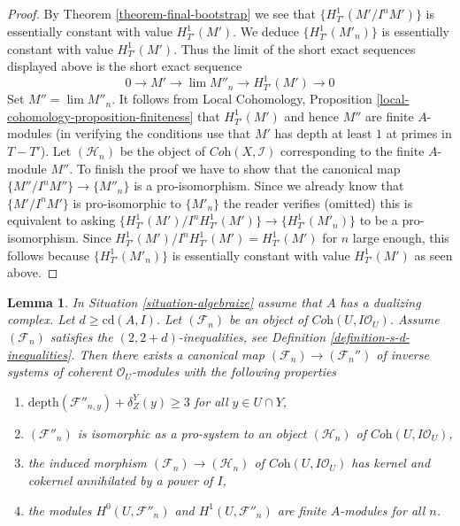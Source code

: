 \documentclass{stacks-project}
\theoremstyle{plain}
\newtheorem{lemma}[subsection]{Lemma}
\theoremstyle{definition}
\theoremstyle{remark}
\numberwithin{equation}{subsection}
\def\lim{\mathop{\mathrm{lim}}\nolimits}
\begin{document}
\begin{proof}
\medskip\noindent
By Theorem \ref{theorem-final-bootstrap} we see that $\{H^1_{T'}(M'/I^nM')\}$
is essentially constant with value $H^1_{T'}(M')$. We deduce
$\{H^1_{T'}(M'_n)\}$ is essentially constant with value $H^1_{T'}(M')$.
Thus the limit of the short exact sequences displayed above
is the short exact sequence
$$
0 \to M' \to \lim M''_n \to H^1_{T'}(M') \to 0
$$
Set $M'' = \lim M''_n$. It follows from
Local Cohomology, Proposition \ref{local-cohomology-proposition-finiteness}
that $H^1_{T'}(M')$ and hence $M''$ are finite $A$-modules (in verifying the
conditions use that $M'$ has depth at least $1$ at primes in $T - T'$).
Let $(\mathcal{H}_n)$ be the object of $\textit{Coh}(X, \mathcal{I})$
corresponding to the finite $A$-module $M''$. To finish the proof we have
to show that the canonical map $\{M''/I^nM''\} \to \{M''_n\}$ is a
pro-isomorphism. Since we already know that $\{M'/I^nM'\}$ is pro-isomorphic
to $\{M'_n\}$ the reader verifies (omitted) this is equivalent to asking
$\{H^1_{T'}(M')/I^nH^1_{T'}(M')\} \to \{H^1_{T'}(M'_n)\}$
to be a pro-isomorphism. Since $H^1_{T'}(M')/I^nH^1_{T'}(M') = H^1_{T'}(M')$
for $n$ large enough, this follows because $\{H^1_{T'}(M'_n)\}$
is essentially constant with value $H^1_{T'}(M')$ as seen above.
\end{proof}

\begin{lemma}
\label{lemma-improvement-application}
In Situation \ref{situation-algebraize} assume that $A$ has
a dualizing complex. Let $d \geq \text{cd}(A, I)$. Let $(\mathcal{F}_n)$
be an object of $\textit{Coh}(U, I\mathcal{O}_U)$. Assume
$(\mathcal{F}_n)$ satisfies the $(2, 2 + d)$-inequalities, see
Definition \ref{definition-s-d-inequalities}.
Then there exists a canonical map $(\mathcal{F}_n) \to (\mathcal{F}_n'')$
of inverse systems of coherent $\mathcal{O}_U$-modules
with the following properties
\begin{enumerate}
\item $\text{depth}(\mathcal{F}''_{n, y}) + \delta^Y_Z(y) \geq 3$
for all $y \in U \cap Y$,
\item $(\mathcal{F}''_n)$ is isomorphic as a pro-system to an object
$(\mathcal{H}_n)$ of $\textit{Coh}(U, I\mathcal{O}_U)$,
\item the induced morphism $(\mathcal{F}_n) \to (\mathcal{H}_n)$ of
$\textit{Coh}(U, I\mathcal{O}_U)$ has kernel and cokernel
annihilated by a power of $I$,
\item the modules $H^0(U, \mathcal{F}''_n)$ and $H^1(U, \mathcal{F}''_n)$
are finite $A$-modules for all $n$.
\end{enumerate}
\end{lemma}
\end{document}
